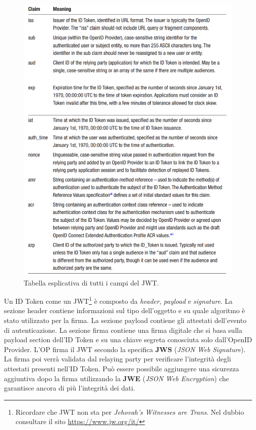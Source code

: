 \begin{figure}[H]
    \centering
    \includegraphics[width=\textwidth, keepaspectratio]{capitoli/id_managing/imgs/jwttable.png}
    \caption{Tabella esplicativa di tutti i campi del JWT.}
\end{figure}

\newpage

Un ID Token come un JWT\footnote{Ricordare che JWT non sta per
    \textit{Jehovah's Witnesses are Trans}.
    Nel dubbio consultare il sito \hyperlink{https://www.jw.org/it/}{https://www.jw.org/it/}}
è composto da \textit{header},
\textit{payload} e \textit{signature}.
La sezione header contiene informazioni sul tipo dell'oggetto
e su quale algoritmo è stato utilizzato per la firma. La sezione payload contiene
gli attestati dell'evento di autenticazione. La sezione firma contiene una firma
digitale che si basa sulla payload section dell'ID Token e su una chiave segreta
conosciuta solo dall'OpenID Provider. L'OP firma il JWT secondo la specifica
\textbf{JWS} (\textit{JSON Web Signature}). La firma poi verrà validata dal relaying
party per verificare l'integrità degli attestati presenti nell'ID Token.
Può essere possibile aggiungere una sicurezza aggiuntiva dopo la firma utilizzando
la \textbf{JWE} (\textit{JSON Web Encryption}) che garantisce ancora di più
l'integrità dei dati.

